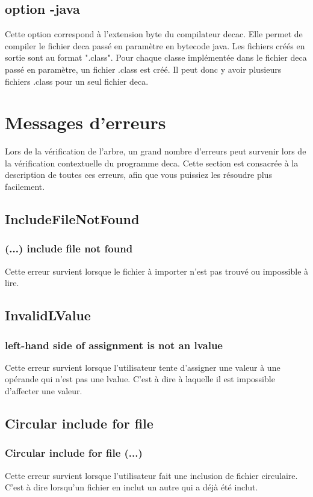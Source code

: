 \documentclass[12pt, a4paper, one side]{article}
\begin{document}
\subsection{option -java}

Cette option correspond à l'extension byte du compilateur decac. Elle permet de compiler le fichier deca passé en paramètre en bytecode java. Les fichiers créés en sortie sont au format ".class". Pour chaque classe implémentée dans le fichier deca passé en paramètre, un fichier .class est créé. Il peut donc y avoir plusieurs fichiers .class pour un seul fichier deca.

\section{Messages d'erreurs}

Lors de la vérification de l'arbre, un grand nombre d'erreurs peut survenir lors de la vérification
contextuelle du programme deca. Cette section est consacrée à la description de toutes ces erreurs,
afin que vous puissiez les résoudre plus facilement.

\subsection{IncludeFileNotFound}
\subsubsection{(...) include file not found}
Cette erreur survient lorsque le fichier à importer n'est pas trouvé ou impossible à lire.


\subsection{InvalidLValue}
\subsubsection{left-hand side of assignment is not an lvalue}
Cette erreur survient lorsque l'utilisateur tente d'assigner une valeur à une opérande qui n'est pas une lvalue. C'est à dire à laquelle il est impossible d'affecter une valeur.


\subsection{Circular include for file }
\subsubsection{Circular include for file (...)}
Cette erreur survient lorsque l'utilisateur fait une inclusion de fichier circulaire. C'est à dire lorsqu'un fichier en inclut un autre qui a déjà été inclut.
\end{document}
